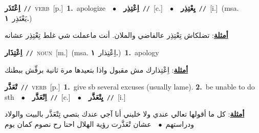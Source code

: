 \documentclass[10pt,a4paper,twoside]{article} %
\begin{document}
\begin{multicols}{2}
{\setlength\topsep{0pt}\textbf{\foreignlanguage{arabic}{اِعْتَذَر}}\ {\color{gray}\texttt{//}\color{black}}\ \textsc{verb}\ [p.]\ \textbf{1.}~apologize\ \ $\bullet$\ \ \setlength\topsep{0pt}\textbf{\foreignlanguage{arabic}{اِعْتِذِر}}\ {\color{gray}\texttt{//}\color{black}}\ [c.]\ \ $\bullet$\ \ \setlength\topsep{0pt}\textbf{\foreignlanguage{arabic}{يِعْتِذِر}}\ {\color{gray}\texttt{//}\color{black}}\ [i.]\ \color{gray}(msa. \foreignlanguage{arabic}{يَعْتَذِر}~\foreignlanguage{arabic}{\textbf{١.}})\color{black}\  \begin{flushright}\color{gray}\foreignlanguage{arabic}{\textbf{\underline{\foreignlanguage{arabic}{أمثلة}}}: تضلكاش تِعْتِذِر عالفاضي والملان. أنت ماعملت شي غلط تِعْتِذِر  عشانه}\end{flushright}\color{black}} \vspace{2mm}

{\setlength\topsep{0pt}\textbf{\foreignlanguage{arabic}{اِعْتِذَار}}\ {\color{gray}\texttt{//}\color{black}}\ \textsc{noun}\ [m.]\ \color{gray}(msa. \foreignlanguage{arabic}{اِعْتِذار}~\foreignlanguage{arabic}{\textbf{١.}})\color{black}\ \textbf{1.}~apology\  \begin{flushright}\color{gray}\foreignlanguage{arabic}{\textbf{\underline{\foreignlanguage{arabic}{أمثلة}}}: اِعْتِذارك مش مقبول واذا بتعيدها مرة ثانية برفِّش ببطنك}\end{flushright}\color{black}} \vspace{2mm}

{\setlength\topsep{0pt}\textbf{\foreignlanguage{arabic}{تْعَذَّر}}\ {\color{gray}\texttt{//}\color{black}}\ \textsc{verb}\ [p.]\ \textbf{1.}~give sb several excuses (usually lame).  \textbf{2.}~be unable to do sth\ \ $\bullet$\ \ \setlength\topsep{0pt}\textbf{\foreignlanguage{arabic}{اِتْعَذَّر}}\ {\color{gray}\texttt{//}\color{black}}\ [c.]\ \ $\bullet$\ \ \setlength\topsep{0pt}\textbf{\foreignlanguage{arabic}{يِتْعَذَّر}}\ {\color{gray}\texttt{//}\color{black}}\ [i.]\  \begin{flushright}\color{gray}\foreignlanguage{arabic}{\textbf{\underline{\foreignlanguage{arabic}{أمثلة}}}: كل ما أقولها تعالي عندي ولا خليني أنا آجي عندك بتصي تِتْعَذَّر بالبيت والولاد ودراستهم\ $\bullet$\ \  عشان تْعَذَّرت رؤية الهلال احنا رح نصوم كمان يوم}\end{flushright}\color{black}} \vspace{2mm}


\end{multicols}
\end{document}
